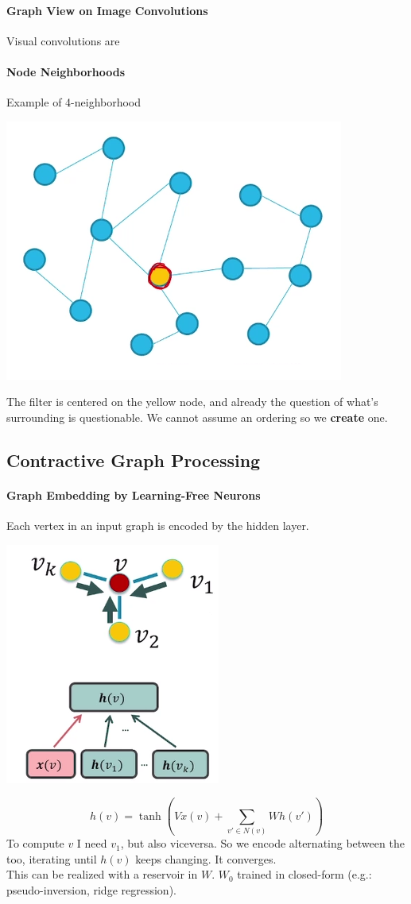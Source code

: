 \documentclass[10pt]{report}
\begin{document}
\paragraph{Graph View on Image Convolutions} Visual convolutions are %
\paragraph{Node Neighborhoods} Example of 4-neighborhood
\begin{center}
	\includegraphics[scale=0.5]{196.png}
\end{center}
The filter is centered on the yellow node, and already the question of what's surrounding is questionable. We cannot assume an ordering so we \textbf{create} one.

\subsection{Contractive Graph Processing}
\paragraph{Graph Embedding by Learning-Free Neurons} Each vertex in an input graph is encoded by the hidden layer.
\begin{center}
	\includegraphics[scale=0.5]{197.png}
\end{center}
$$h(v) = \tanh\left(V x(v)+\sum_{v'\in N(v)} Wh(v')\right)$$ %
To compute $v$ I need $v_1$, but also viceversa. So we encode alternating between the too, iterating until $h(v)$ keeps changing. It converges.\\
This can be realized with a reservoir in $W$. $W_0$ trained in closed-form (e.g.: pseudo-inversion, ridge regression).
\end{document}
